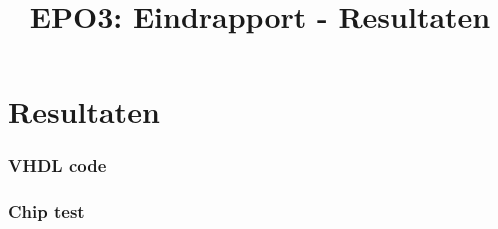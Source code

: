 \documentclass{scrartcl} %
\author{}
\title{EPO3: Eindrapport - Resultaten}
\begin{document}
\chapter{Resultaten}
\label{ch:resultaten}

\subsection{VHDL code}









\subsection{Chip test}
\end{document}

